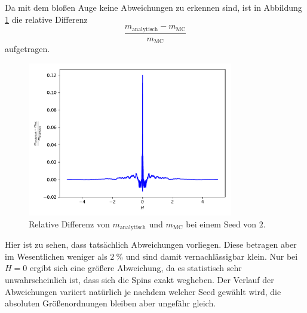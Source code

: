 Da mit dem bloßen Auge keine Abweichungen zu erkennen sind, ist in Abbildung \ref{fig:differenz} die relative Differenz
\begin{equation*}
  \frac{m_\text{analytisch} - m_\text{MC}}{m_\text{MC}}
\end{equation*}
aufgetragen.
\begin{figure}
  \includegraphics[width=0.8\textwidth]{A1/build/rel_differenz.pdf}
  \caption{Relative Differenz von \(m_\text{analytisch}\) und \(m_\text{MC}\) bei einem Seed von \(2\).}
  \label{fig:differenz}
\end{figure}
Hier ist zu sehen, dass tatsächlich Abweichungen vorliegen. Diese betragen aber im Wesentlichen weniger als \(\SI{2}{\%}\) und sind damit vernachlässigbar klein.
Nur bei \(H=0\) ergibt sich eine größere Abweichung, da es statistisch sehr unwahrscheinlich ist, dass sich die Spins exakt wegheben.
Der Verlauf der Abweichungen variiert natürlich je nachdem welcher Seed gewählt wird, die absoluten Größenordnungen bleiben aber ungefähr gleich.
